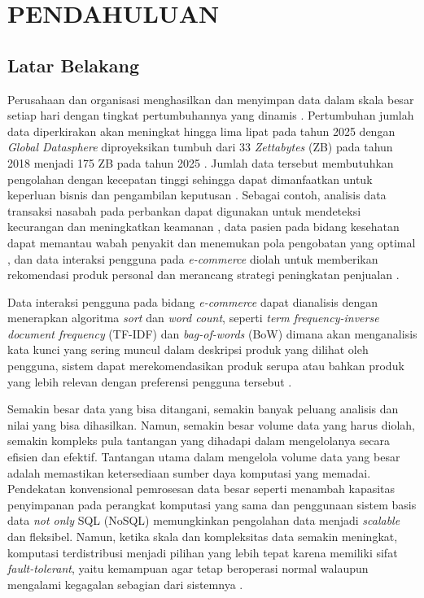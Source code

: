 \chapter{PENDAHULUAN}

\section{Latar Belakang}

Perusahaan dan organisasi menghasilkan dan menyimpan data dalam skala besar setiap hari dengan tingkat pertumbuhannya yang dinamis \cite{samadiPerformanceComparisonHadoop2018}. Pertumbuhan jumlah data diperkirakan akan meningkat hingga lima lipat pada tahun 2025 dengan \textit{Global Datasphere} diproyeksikan tumbuh dari 33 \textit{Zettabytes} (ZB) pada tahun 2018 menjadi 175 ZB pada tahun 2025 \cite{reinselDigitizationWorldEdge2018}. Jumlah data tersebut membutuhkan pengolahan dengan kecepatan tinggi sehingga dapat dimanfaatkan untuk keperluan bisnis dan pengambilan keputusan \cite{adrianExpertReviewBig2018}. Sebagai contoh, analisis data transaksi nasabah pada perbankan dapat digunakan untuk mendeteksi kecurangan dan meningkatkan keamanan \cite{syahputraPendeteksianFraudPeran2020}, data pasien pada bidang kesehatan dapat memantau wabah penyakit dan menemukan pola pengobatan yang optimal \cite{sulaimanLITERATUREREVIEWPENERAPAN2023}, dan data interaksi pengguna pada \textit{e-commerce} diolah untuk memberikan rekomendasi produk personal dan merancang strategi peningkatan penjualan \cite{fernandoUtilizationBigData2020}. 

Data interaksi pengguna pada bidang \textit{e-commerce} dapat dianalisis dengan menerapkan algoritma \textit{sort} dan \textit{word count}, seperti \textit{term frequency-inverse document frequency} (TF-IDF) dan \textit{bag-of-words} (BoW) dimana akan menganalisis kata kunci yang sering muncul dalam deskripsi produk yang dilihat oleh pengguna, sistem dapat merekomendasikan produk serupa atau bahkan produk yang lebih relevan dengan preferensi pengguna tersebut \cite{shrivastavaProductRecommendationsUsing2019}.

Semakin besar data yang bisa ditangani, semakin banyak peluang analisis dan nilai yang bisa dihasilkan. Namun, semakin besar volume data yang harus diolah, semakin kompleks pula tantangan yang dihadapi dalam mengelolanya secara efisien dan efektif. Tantangan utama dalam mengelola volume data yang besar adalah memastikan ketersediaan sumber daya komputasi yang memadai. Pendekatan konvensional pemrosesan data besar seperti menambah kapasitas penyimpanan pada perangkat komputasi yang sama dan penggunaan sistem basis data \textit{not only} SQL (NoSQL) memungkinkan pengolahan data menjadi \textit{scalable} dan fleksibel. Namun, ketika skala dan kompleksitas data semakin meningkat, komputasi terdistribusi menjadi pilihan yang lebih tepat karena memiliki sifat \textit{fault-tolerant}, yaitu kemampuan agar tetap beroperasi normal walaupun mengalami kegagalan sebagian dari sistemnya \cite{saadoonFaultToleranceBig2022}.

